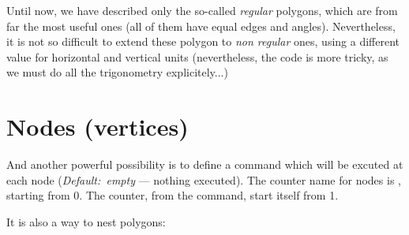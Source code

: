 \documentclass[11pt,english,BCOR10mm,DIV12,bibliography=totoc,parskip=false,smallheadings
    headexclude,footexclude,oneside]{pst-doc}
\begin{document}
Until now, we have described only the so-called \emph{regular} polygons,
which are from far the most useful ones (all of them have equal edges and
angles). Nevertheless, it is not so difficult to extend these polygon to
\emph{non regular} ones, using a different value for horizontal and vertical
units (nevertheless, the code is more tricky, as we must do all the
trigonometry explicitely...)
%
\begin{LTXexample}[pos=t]
  \PstPentagon[xunit=0.5]\hfill
  \PstHexagon[yunit=0.5]\hfill
  \PstStarFive[xunit=0.5,yunit=1.5]\hfill
  \PstPolygon[xunit=0.8,yunit=1.5,PolyNbSides=9,PolyOffset=2,
              PolyIntermediatePoint=0.1,PolyCurves=true]
\end{LTXexample}
%
\section{Nodes (vertices)}
%
And another powerful possibility is to define a command
  which will be excuted at each node (\emph{Default:~empty} --- nothing executed). 
The counter name for nodes is , starting from 0. The  counter, from the
 command, start itself from 1.

\begin{LTXexample}[width=0.3\linewidth,pos=l]
  \providecommand{\PstPolygonNode}{%
    \psdots[dotsize=0.2,linecolor=cyan](1;\INode)}
  \PstPentagon
\end{LTXexample}
%
\begin{LTXexample}[width=0.3\linewidth,pos=l]
  \providecommand{\PstPolygonNode}{%
    \setcounter{Letter}{\the\multidocount}%
    \rput*{*0}(1;\INode){\small\Alph{Letter}}}
  \PstHeptagon[PolyOffset=3]
\end{LTXexample}
%
\begin{LTXexample}[pos=l,width=0.3\linewidth]
  \providecommand{\PstPolygonNode}{%
    \psdots[dotstyle=o,dotsize=0.2](1;\INode)
    \psline[linecolor=red]{->}(0.9;\INode)}
  \PstPolygon[PolyNbSides=8]
\end{LTXexample}
%
\vspace{3mm}
  It is also a way to nest polygons:
\vspace{3mm}
%
\begin{LTXexample}[pos=l,width=0.3\linewidth]
  \newbox{\Star}
  \savebox{\Star}{%
    \PstStarFive*[unit=0.15,linecolor=red]}
  \providecommand{\PstPolygonNode}{%
    \rput{*0}(1;\INode){\usebox{\Star}}}
  \shortstack{\PstNonagon\\[5mm]
              \PstDodecagon[linestyle=none]}
\end{LTXexample}
\end{document}
